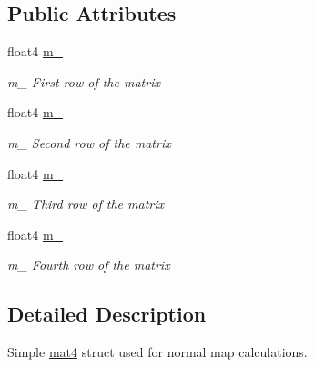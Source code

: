 \subsection*{Public Attributes}
\begin{DoxyCompactItemize}
\item 
\hypertarget{structmat4_a8164befea75e083db99208f2a1efc2d1}{float4 \hyperlink{structmat4_a8164befea75e083db99208f2a1efc2d1}{m\-\_}}\label{structmat4_a8164befea75e083db99208f2a1efc2d1}

\begin{DoxyCompactList}\small\item\em m\-\_ First row of the matrix \end{DoxyCompactList}\item 
\hypertarget{structmat4_ac4662700e6b5e12aca44fdc20eb9f1f9}{float4 \hyperlink{structmat4_ac4662700e6b5e12aca44fdc20eb9f1f9}{m\-\_}}\label{structmat4_ac4662700e6b5e12aca44fdc20eb9f1f9}

\begin{DoxyCompactList}\small\item\em m\-\_ Second row of the matrix \end{DoxyCompactList}\item 
\hypertarget{structmat4_abcc223150819c1d631d1ae43d19f797e}{float4 \hyperlink{structmat4_abcc223150819c1d631d1ae43d19f797e}{m\-\_}}\label{structmat4_abcc223150819c1d631d1ae43d19f797e}

\begin{DoxyCompactList}\small\item\em m\-\_ Third row of the matrix \end{DoxyCompactList}\item 
\hypertarget{structmat4_aa79915fc96128ebadd96c12385615c84}{float4 \hyperlink{structmat4_aa79915fc96128ebadd96c12385615c84}{m\-\_}}\label{structmat4_aa79915fc96128ebadd96c12385615c84}

\begin{DoxyCompactList}\small\item\em m\-\_ Fourth row of the matrix \end{DoxyCompactList}\end{DoxyCompactItemize}


\subsection{Detailed Description}
Simple \hyperlink{structmat4}{mat4} struct used for normal map calculations. 

